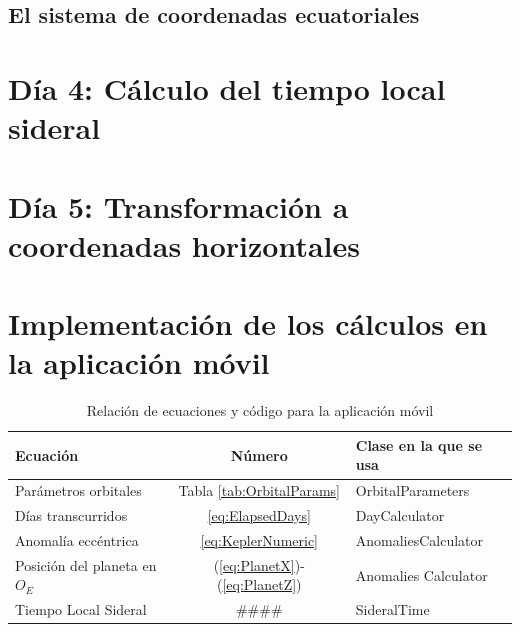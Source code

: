 \documentclass[a4paper,10pt]{article}
\begin{document}
\subsection{El sistema de coordenadas ecuatoriales}

\section{Día 4: Cálculo del tiempo local sideral}

\section{Día 5: Transformación a coordenadas horizontales}

\section{Implementación de los cálculos en la aplicación móvil}
\begin{table}[!h]
  \centering
  \begin{tabular}{lcl}
    Ecuación & Número & Clase en la que se usa\\
    \hline
    Parámetros orbitales & Tabla \ref{tab:OrbitalParams} & OrbitalParameters\\
    Días transcurridos & \ref{eq:ElapsedDays} & DayCalculator\\
    Anomalía eccéntrica & \ref{eq:KeplerNumeric} & AnomaliesCalculator\\
    Posición del planeta en $O_E$ & (\ref{eq:PlanetX})-(\ref{eq:PlanetZ}) & Anomalies Calculator\\
    Tiempo Local Sideral & \#\#\#\# & SideralTime\\
    \hline
  \end{tabular}
  \caption{Relación de ecuaciones y código para la aplicación móvil}
  \label{tab:EqsAndCode}
\end{table}
\end{document}

